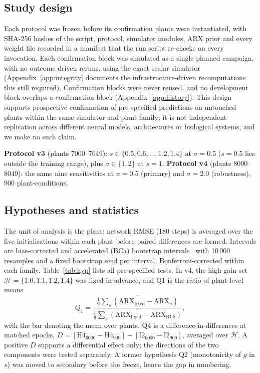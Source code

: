 \documentclass[11pt]{article}
\begin{document}
\subsection{Study design}
Each protocol was frozen before its confirmation plants were instantiated, with SHA-256 hashes of the script, protocol, simulator modules, ARX prior and every weight file recorded in a manifest that the run script re-checks on every invocation. Each confirmation block was simulated as a single planned campaign, with no outcome-driven reruns, using the exact scalar simulator (Appendix~\ref{app:integrity} documents the infrastructure-driven recomputations this still required). Confirmation blocks were never reused, and no development block overlaps a confirmation block (Appendix~\ref{app:history}). This design supports prospective confirmation of pre-specified predictions on untouched plants within the same simulator and plant family; it is not independent replication across different neural models, architectures or biological systems, and we make no such claim.

\textbf{Protocol v3} (plants 7000--7049): $s\in\{0.5,0.6,\dots,1.2,1.4\}$ at $\sigma=0.5$ ($s=0.5$ lies outside the training range), plus $\sigma\in\{1,2\}$ at $s=1$. \textbf{Protocol v4} (plants 8000--8049): the same nine sensitivities at $\sigma=0.5$ (primary) and $\sigma=2.0$ (robustness), 900 plant-conditions.

\subsection{Hypotheses and statistics}
The unit of analysis is the plant: network RMSE (180 steps) is averaged over the five initialisations within each plant before paired differences are formed. Intervals are bias-corrected and accelerated (BCa) bootstrap intervals~\cite{efron1987} with 10\,000 resamples and a fixed bootstrap seed per interval, Bonferroni-corrected within each family. Table~\ref{tab:hyp} lists all pre-specified tests. In v4, the high-gain set $\mathcal H=\{1.0,1.1,1.2,1.4\}$ was fixed in advance, and Q1 is the ratio of plant-level means
\begin{equation}
Q_1=\frac{\overline{\textstyle\frac19\sum_s(\mathrm{ARX}_{\mathrm{fixed}}-\mathrm{ARX}_g)}}{\overline{\textstyle\frac19\sum_s(\mathrm{ARX}_{\mathrm{fixed}}-\mathrm{ARX}_{\mathrm{RLS}})}},
\end{equation}
with the bar denoting the mean over plants. Q4 is a difference-in-differences at matched epochs, $D=[\text{H4}_{6000}-\text{H4}_{900}]-[\text{I2}_{6000}-\text{I2}_{900}]$, averaged over $\mathcal H$. A positive $D$ supports a differential effect only; the directions of the two components were tested separately. A former hypothesis Q2 (monotonicity of $g$ in $s$) was moved to secondary before the freeze, hence the gap in numbering.
\end{document}
